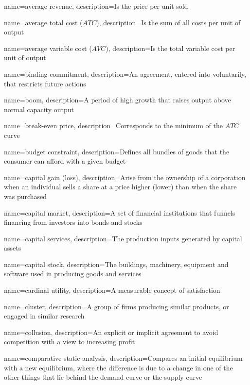 {
	name={average revenue},
	description={Is the price per unit sold}
}

{
	name={average total cost ($ATC$)},
	description={Is the sum of all costs per unit of output}
}

{
	name={average variable cost ($AVC$)},
	description={Is the total variable cost per unit of output}
}

{
	name={binding commitment},
	description={An agreement, entered into voluntarily, that restricts future actions}
}

{
	name={boom},
	description={A period of high growth that raises output above normal capacity output}
}

{
	name={break-even price},
	description={Corresponds to the minimum of the $ATC$ curve}
}

{
	name={budget constraint},
	description={Defines all bundles of goods that the consumer can afford with a given budget}
}

{
	name={capital gain (loss)},
	description={Arise from the ownership of a corporation when an individual sells a share at a price higher (lower) than when the share was purchased}
}

{
	name={capital market},
	description={A set of financial institutions that funnels financing from investors into bonds and stocks}
}

{
	name={capital services},
	description={The production inputs generated by capital assets}
}

{
	name={capital stock},
	description={The buildings, machinery, equipment and software used in producing goods and services}
}

{
	name={cardinal utility},
	description={A measurable concept of satisfaction}
}

{
	name=cluster,
	description={A group of firms producing similar products, or engaged in similar research}
}

{
	name=collusion,
	description={An explicit or implicit agreement to avoid competition with a view to increasing profit}
}

{
	name={comparative static analysis},
	description={Compares an initial equilibrium with a new equilibrium, where the difference is due to a change in one of the other things that lie behind the demand curve or the supply curve}
}

